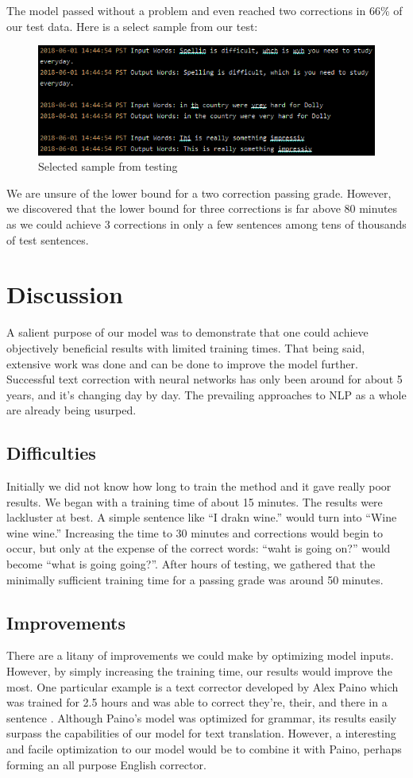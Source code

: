 \documentclass[11pt,a4paper]{scrartcl}
\theoremstyle{definition}
\begin{document}
The model passed without a problem and even reached two corrections in 66\% of our test data. Here is a select sample from our test:

\begin{figure}[!ht]
\centering
\includegraphics[scale=1]{results_1.png}
\caption{Selected sample from testing}
\label{figR2}
\end{figure}
\FloatBarrier

We are unsure of the lower bound for a two correction passing grade. However, we discovered that the lower bound for three corrections is far above 80 minutes as we could achieve 3 corrections in only a few sentences among tens of thousands of test sentences.

\section{Discussion}
A salient purpose of our model was to demonstrate that one could achieve objectively beneficial results with limited training times. That being said, extensive work was done and can be done to improve the model further. Successful text correction with neural networks has only been around for about 5 years, and it's changing day by day. The prevailing approaches to NLP as a whole are already being usurped.

\subsection{Difficulties}
Initially we did not know how long to train the method and it gave really poor results. We began with a training time of about 15 minutes. The results were lackluster at best. A simple sentence like “I drakn wine.” would turn into “Wine wine wine.” Increasing the time to 30 minutes and corrections would begin to occur, but only at the expense of the correct words: “waht is going on?” would become “what is going going?”. After hours of testing, we gathered that the minimally sufficient training time for a passing grade was around 50 minutes. 
\subsection{Improvements}
There are a litany of improvements we could make by optimizing model inputs. However, by simply increasing the training time, our results would improve the most. One particular example is a text corrector developed by Alex Paino which was trained for 2.5 hours and was able to correct they're, their, and there in a sentence \cite{Floyd}. Although Paino's model was optimized for grammar, its results easily surpass the capabilities of our model for text translation. However, a interesting and facile optimization to our model would be to combine it with Paino, perhaps forming an all purpose English corrector.
\end{document}
